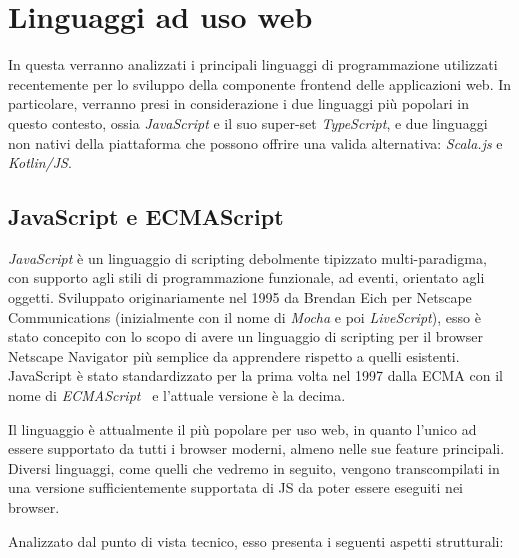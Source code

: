   \section{Linguaggi ad uso web}\label{sec:lang}
    In questa  verranno analizzati i principali linguaggi di programmazione utilizzati recentemente per lo sviluppo della componente frontend delle applicazioni web.
    In particolare, verranno presi in considerazione i due linguaggi più popolari in questo contesto, ossia \emph{JavaScript} e il suo super-set \emph{TypeScript}, e due linguaggi non nativi della piattaforma che possono offrire una valida alternativa:
    \emph{Scala.js} e \emph{Kotlin/JS}\@.

    \subsection{JavaScript e ECMAScript}\label{subsec:js}


      \emph{JavaScript} è un linguaggio di scripting debolmente tipizzato multi-paradigma, con supporto agli stili di programmazione funzionale, ad eventi, orientato agli oggetti.
      Sviluppato originariamente nel 1995 da Brendan Eich per Netscape Communications (inizialmente con il nome di \emph{Mocha} e poi \emph{LiveScript}),
      esso è stato concepito con lo scopo di avere un linguaggio di scripting per il browser Netscape Navigator più semplice da apprendere rispetto a quelli esistenti.
      JavaScript è stato standardizzato per la prima volta nel 1997 dalla ECMA con il nome di \emph{ECMAScript}~\cite{ECMA-262,ISO:1998} e l'attuale versione è la decima.

      Il linguaggio è attualmente il più popolare per uso web, in quanto l'unico ad essere supportato da tutti i browser moderni, almeno nelle sue feature principali.
      Diversi linguaggi, come quelli che vedremo in seguito, vengono transcompilati in una versione sufficientemente supportata di JS da poter essere eseguiti nei browser.

      Analizzato dal punto di vista tecnico, esso presenta i seguenti aspetti strutturali:

